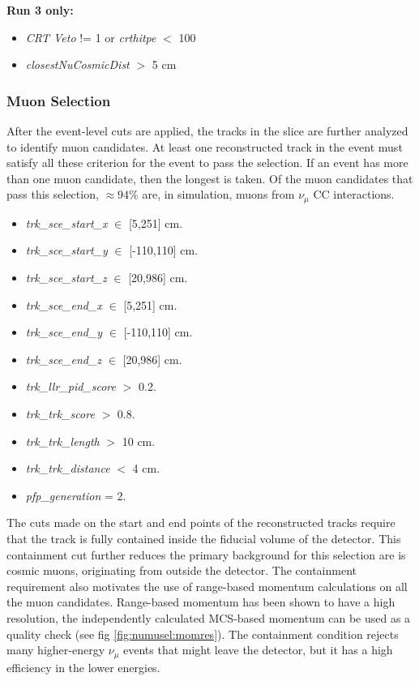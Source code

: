 \textbf{Run 3 only:}
\begin{itemize}
    \item \emph{CRT Veto} != 1 or \emph{crthitpe} $<$ 100
    \item \emph{closestNuCosmicDist} $>$ 5 cm
\end{itemize}

\subsubsection{Muon Selection}
\label{sssec:NuMUCCsel:constr:muonsel}

\par After the event-level cuts are applied, the tracks in the slice are further analyzed to identify muon candidates. At least one reconstructed track in the event must satisfy all these criterion for the event to pass the selection. If an event has more than one muon candidate, then the longest is taken. Of the muon candidates that pass this selection, $\approx 94\%$ are, in simulation, muons from $\nu_{\mu}$ CC interactions.

\begin{itemize}
    \item \emph{trk\_sce\_start\_x} $\in$ [5,251] cm.
    \item \emph{trk\_sce\_start\_y} $\in$ [-110,110] cm.
    \item \emph{trk\_sce\_start\_z} $\in$ [20,986] cm.
    \item \emph{trk\_sce\_end\_x} $\in$ [5,251] cm.
    \item \emph{trk\_sce\_end\_y} $\in$ [-110,110] cm.
    \item \emph{trk\_sce\_end\_z} $\in$ [20,986] cm.
    \item \emph{trk\_llr\_pid\_score} $>$ 0.2.
    \item \emph{trk\_trk\_score} $>$ 0.8.
    \item \emph{trk\_trk\_length} $>$ 10 cm.
    \item \emph{trk\_trk\_distance} $<$ 4 cm.
    \item \emph{pfp\_generation} = 2.
\end{itemize}

\par \noindent The cuts made on the start and end points of the reconstructed tracks require that the track is fully contained inside the fiducial volume of the detector. This containment cut further reduces the primary background for this selection are is cosmic muons, originating from outside the detector. The containment requirement also motivates the use of range-based momentum calculations on all the muon candidates. Range-based momentum has been shown to have a high resolution, the independently calculated MCS-based momentum can be used as a quality check (see fig \ref{fig:numusel:momres}). The containment condition rejects many higher-energy $\nu_{\mu}$ events that might leave the detector, but it has a high efficiency in the lower energies.

